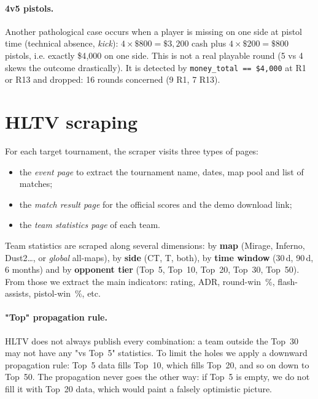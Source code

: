 \paragraph{4v5 pistols.} Another pathological case occurs when a
player is missing on one side at pistol time (technical absence,
\emph{kick}): $4 \times \$800 = \$3{,}200$ cash plus
$4 \times \$200 = \$800$ pistols, i.e. exactly \$4{,}000 on one side.
This is not a real playable round (5 vs 4 skews the outcome
drastically). It is detected by \texttt{money\_total~==~\$4{,}000} at
R1 or R13 and dropped: 16 rounds concerned (9 R1, 7 R13).

\section{HLTV scraping}
\label{annex:scraping}

For each target tournament, the scraper visits three types of pages:
\begin{itemize}
  \item the \emph{event page} to extract the tournament name, dates,
    map pool and list of matches;
  \item the \emph{match result page} for the official scores and the
    demo download link;
  \item the \emph{team statistics page} of each team.
\end{itemize}

Team statistics are scraped along several dimensions: by \textbf{map}
(Mirage, Inferno, Dust2\dots, or \emph{global} all-maps), by
\textbf{side} (CT, T, both), by \textbf{time window} (30\,d, 90\,d,
6 months) and by \textbf{opponent tier} (Top~5, Top~10, Top~20,
Top~30, Top~50). From those we extract the main indicators: rating,
ADR, round-win~\%, flash-assists, pistol-win~\%, etc.

\paragraph{"Top" propagation rule.}
HLTV does not always publish every combination: a team outside the
Top~30 may not have any "vs Top~5" statistics. To limit the holes
we apply a downward propagation rule: Top~5 data fills Top~10, which
fills Top~20, and so on down to Top~50. The propagation never goes
the other way: if Top~5 is empty, we do not fill it with Top~20 data,
which would paint a falsely optimistic picture.

